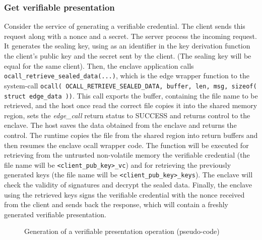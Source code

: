 \subsubsection{Get verifiable presentation}
Consider the service of generating a verifiable credential. The client sends this request along with a nonce and a secret. The server process the incoming request. It generates the sealing key, using as an identifier in the key derivation function the client's public key and the secret sent by the client. (The sealing key will be equal for the same client). Then, the enclave application calls \texttt{ocall\_retrieve\_sealed\_data(...)}, which is the edge wrapper function to the system-call \texttt{ocall( OCALL\_RETRIEVE\_SEALED\_DATA, buffer, len, msg, sizeof( struct edge\_data ))}. This call exports the buffer, containing the file name to be retrieved, and the host once read the correct file copies it into the shared memory region, sets the \textit{edge\_call} return status to SUCCESS and returns control to the enclave. The host saves the data obtained from the enclave and returns the control. The runtime copies the file from the shared region into return buffers and then resumes the enclave ocall wrapper code.
The function will be executed for retrieving from the untrusted non-volatile memory the verifiable credential (the file name will be \texttt{<client\_pub\_key>\_vc}) and for retrieving the previously generated keys (the file name will be \texttt{<client\_pub\_key>\_keys}).
The enclave will check the validity of signatures and decrypt the sealed data.  
Finally, the enclave using the retrieved keys signs the verifiable credential with the nonce received from the client and sends back the response, which will contain a freshly generated verifiable presentation. 

\begin{figure}[!h]
    \centering
    
    \caption{Generation of a verifiable presentation operation (pseudo-code)}
    \label{poc-get-vp}
\end{figure}


